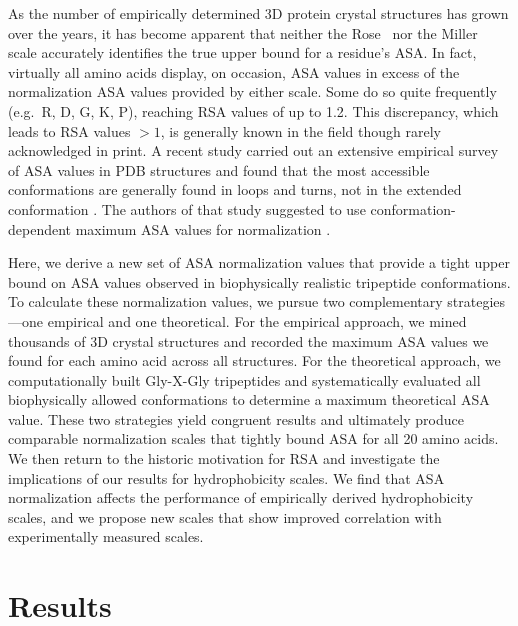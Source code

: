 \documentclass[11pt]{article}
\begin{document}
As the number of empirically determined 3D protein crystal structures has grown over the years, it has become apparent that neither the Rose~\cite{Rose1985} nor the Miller~\cite{Miller1987} scale accurately identifies the true upper bound for a residue's ASA. In fact, virtually all amino acids display, on occasion, ASA values in excess of the normalization ASA values provided by either scale. Some do so quite frequently (e.g.\ R, D, G, K, P), reaching RSA values of up to 1.2. This discrepancy, which leads to RSA values $>1$, is generally known in the field though rarely acknowledged in print. A recent study carried out an extensive empirical survey of ASA values in PDB structures and found that the most accessible conformations are generally found in loops and turns, not in the extended conformation \cite{SinghAhmad2009}. The authors of that study suggested to use conformation-dependent maximum ASA values for normalization \cite{SinghAhmad2009}.

Here, we derive a new set of ASA normalization values that provide a tight upper bound on ASA values observed in biophysically realistic tripeptide conformations. To calculate these normalization values, we pursue two complementary strategies---one empirical and one theoretical. For the empirical approach, we mined thousands of 3D crystal structures and recorded the maximum ASA values we found for each amino acid across all structures. For the theoretical approach, we computationally built Gly-X-Gly tripeptides and systematically evaluated all biophysically allowed conformations to determine a maximum theoretical ASA value. These two strategies yield congruent results and ultimately produce comparable normalization scales that tightly bound ASA for all 20 amino acids. We then return to the historic motivation for RSA and investigate the implications of our results for hydrophobicity scales. We find that ASA normalization affects the performance of empirically derived hydrophobicity scales, and we propose new scales that show improved correlation with experimentally measured scales.


\section*{Results}
\end{document}

